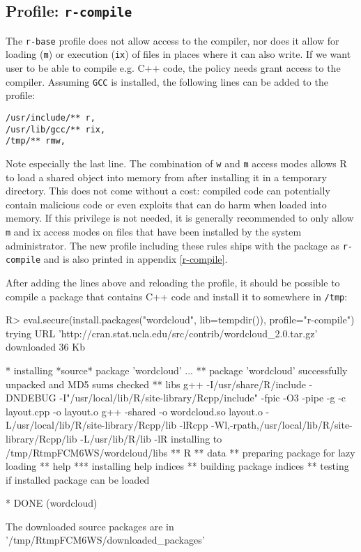 \documentclass{jss}
\newcommand{\R}{\textsf{R}\xspace}
\newcommand{\Cpp}{\textsf{C++}\xspace}
\begin{document}
\subsection[Profile: r-compile]{Profile: \texttt{r-compile}}

The \texttt{r-base} profile does not allow access to the compiler, nor does it
allow for loading (\texttt{m}) or execution (\texttt{ix}) of files in places
where it can also write. If we want user to be able to compile e.g. \Cpp code,
the policy needs grant access to the compiler. Assuming \texttt{GCC} is
installed, the following lines can be added to the profile:

\begin{verbatim}
/usr/include/** r,
/usr/lib/gcc/** rix,
/tmp/** rmw,
\end{verbatim}

Note especially the last line. The combination of \texttt{w} and \texttt{m}
access modes allows \R to load a shared object into memory from after
installing it in a temporary directory. This does not come without a cost:
compiled code can potentially contain malicious code or even exploits that can
do harm when loaded into memory. If this privilege is not needed, it is
generally recommended to only allow \texttt{m} and {ix} access modes on files
that have been installed by the system administrator. The new profile including
these rules ships with the package as \texttt{r-compile} and is also printed in
appendix \ref{r-compile}.

After adding the lines above and reloading the profile, it should be possible to
compile a package that contains \Cpp code and install it to somewhere
in \texttt{/tmp}:

\begin{CodeChunk}
\begin{CodeInput}
R> eval.secure(install.packages("wordcloud", lib=tempdir()), profile="r-compile")
trying URL 'http://cran.stat.ucla.edu/src/contrib/wordcloud_2.0.tar.gz'
downloaded 36 Kb

* installing *source* package 'wordcloud' ...
** package 'wordcloud' successfully unpacked and MD5 sums checked
** libs
g++ -I/usr/share/R/include -DNDEBUG -I"/usr/local/lib/R/site-library/Rcpp/include"
   -fpic  -O3 -pipe  -g  -c layout.cpp -o layout.o
g++ -shared -o wordcloud.so layout.o -L/usr/local/lib/R/site-library/Rcpp/lib
   -lRcpp -Wl,-rpath,/usr/local/lib/R/site-library/Rcpp/lib -L/usr/lib/R/lib -lR
installing to /tmp/RtmpFCM6WS/wordcloud/libs
** R
** data
** preparing package for lazy loading
** help
*** installing help indices
** building package indices
** testing if installed package can be loaded

* DONE (wordcloud)

The downloaded source packages are in
	'/tmp/RtmpFCM6WS/downloaded_packages'
\end{CodeInput}
\end{CodeChunk}
\end{document}
